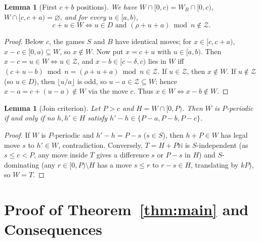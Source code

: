 \documentclass[11pt]{article}
\newtheorem{lemma}[theorem]{Lemma}
\theoremstyle{remark}
\begin{document}
\begin{lemma}[First $c + b$ positions]\label{lem:init}
We have $W \cap [0, c) = W_B \cap [0, c)$, $W \cap [c, c + a) = \varnothing$, and for every $u \in [a, b)$,
\[
c + u \in W \iff u \in D \text{ and } (\rho + u + a) \bmod n \notin \mathcal{Z}.
\]
\end{lemma}

\begin{proof}
Below $c$, the games $S$ and $B$ have identical moves; for $x \in [c, c+a)$, $x - c \in [0, a) \subseteq W$, so $x \notin W$. Now put $x = c + u$ with $u \in [a, b)$. Then $x - c = u \in W \iff u \in \mathcal{Z}$, and $x - b \in [c - \delta, c)$ lies in $W$ iff $(c + u - b) \bmod n = (\rho + u + a) \bmod n \in \mathcal{Z}$. If $u \in \mathcal{Z}$, then $x \notin W$. If $u \notin \mathcal{Z}$ (so $u \in D$), then $\lfloor u/a \rfloor$ is odd, so $u - a \in \mathcal{Z} \subseteq W$; hence $x - a = c + (u - a) \notin W$ via the move $c$. Thus $x \in W \iff x - b \notin W$.
\end{proof}

\begin{lemma}[Join criterion]\label{lem:join}
Let $P > c$ and $H = W \cap [0, P)$. Then $W$ is $P$-periodic if and only if no $h, h' \in H$ satisfy $h' - h \in \{P - a, P - b, P - c\}$.
\end{lemma}

\begin{proof}
If $W$ is $P$-periodic and $h' - h = P - s$ ($s \in S$), then $h + P \in W$ has legal move $s$ to $h' \in W$, contradiction. Conversely, $T = H + P\mathbb{N}$ is $S$-independent (as $s \le c < P$, any move inside $T$ gives a difference $s$ or $P - s$ in $H$) and $S$-dominating (any $r \in [0, P) \setminus H$ has a move $s \le r$ to $r - s \in H$, translating by $kP$), so $W = T$.
\end{proof}

\section{Proof of Theorem~\ref{thm:main} and Consequences}
\end{document}
